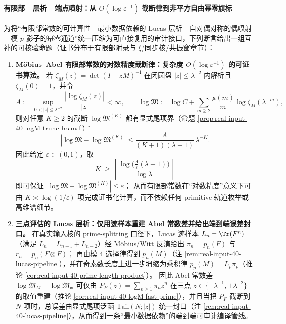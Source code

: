 \paragraph{有限部—层析—端点喷射：从 \texorpdfstring{$O(\log\varepsilon^{-1})$}{O(log eps^-1)} 截断律到非平方自由幂零旗标}
为将“有限部常数的可计算性—最小数据依赖的 Lucas 层析—自对偶对称的偶喷射—模 \(p\) 影子的幂零通道”统一压缩为可直接复用的审计接口，下列断言给出一组互补的可核验命题（证书分布于有限部附录与 \(\xi\)/同步核/共振窗章节）：
\begin{enumerate}
  \item \textbf{Möbius--Abel 有限部常数的对数精度截断律：复杂度 \texorpdfstring{$O(\log\varepsilon^{-1})$}{O(log eps^-1)} 的可证书算法。}
  若 \(\zeta_M(z)=\det(I-zM)^{-1}\) 在闭圆盘 \(|z|\le \lambda^{-2}\) 内解析且 \(\zeta_M(0)=1\)，并令
  \[
  A:=\sup_{0<|z|\le \lambda^{-2}}\frac{|\log\zeta_M(z)|}{|z|}<\infty,
  \qquad
  \log\mathfrak{M}:=\log C+\sum_{m\ge 2}\frac{\mu(m)}{m}\log\zeta_M(\lambda^{-m}),
  \]
  则对任意 \(K\ge 2\) 的截断 \(\log\mathfrak{M}^{(K)}\) 都有显式尾项界（命题 \ref{prop:real-input-40-logM-trunc-bound}）：
  \[
  |\log\mathfrak{M}-\log\mathfrak{M}^{(K)}|
  \le \frac{A}{(K+1)(\lambda-1)}\,\lambda^{-K}.
  \]
  因此给定 \(\varepsilon\in(0,1)\)，取
  \[
  K\ \ge\ \left\lceil \frac{\log\!\bigl(\tfrac{A}{\varepsilon}(\lambda-1)\bigr)}{\log \lambda}\right\rceil
  \]
  即可保证 \(|\log\mathfrak{M}-\log\mathfrak{M}^{(K)}|\le \varepsilon\)；
  从而有限部常数在“对数精度”意义下可由 \(K\asymp \log(1/\varepsilon)\) 项完成证书化计算，而不依赖任何 primitive 轨道枚举或高维谱细节。

  \item \textbf{三点评估的 Lucas 层析：仅用迹样本重建 Abel 常数差并给出端到端误差封口。}
  在真实输入核的 prime-splitting 口径下，Lucas 迹样本 \(L_n=\Tr(F^n)\)（满足 \(L_n=L_{n-1}+L_{n-2}\)）经 Möbius/Witt 反演给出
  \(
  \pi_n=p_n(F)
  \)
  与
  \(
  r_n=p_n(F\otimes F)
  \)；
  再由模 \(4\) 选择律得到 \(p_n(M)\)（注 \ref{rem:real-input-40-lucas-pipeline}），并在奇素数长度上进一步坍缩为乘积律 \(p_p(M)=L_p\pi_p\)（推论 \ref{cor:real-input-40-prime-length-product}）。
  因此 Abel 常数差 \(\log\mathfrak{M}_M-\log\mathfrak{M}_{\mathrm{in}}\) 可仅由 \(P_F(z)=\sum_{n\ge 1}\pi_n z^n\) 在三点 \(z\in\{-\lambda^{-1},\pm\lambda^{-2}\}\) 的取值重建（推论 \ref{cor:real-input-40-logM-fast-prime}），并且当把 \(P_F\) 截断到 \(N\) 项时，总误差由显式尾项泛函 \(\mathrm{Tail}(N;|z|)\) 统一封口（注 \ref{rem:real-input-40-lucas-pipeline}），从而得到一条“最小数据依赖”的端到端可审计编译管线。


\end{enumerate}

